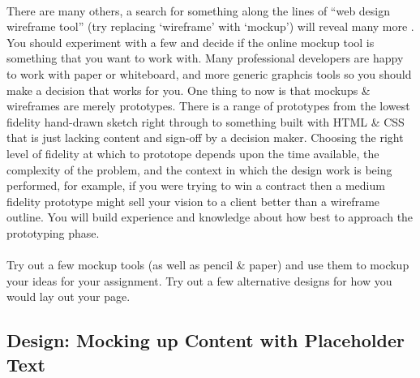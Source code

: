 \documentclass[10pt, a4paper]{article}
\begin{document}
\paragraph{} There are many others, a search for something along the lines of ``web design wireframe tool'' (try replacing `wireframe' with `mockup') will reveal many more . You should experiment with a few and decide if the online mockup tool is something that you want to work with. Many professional developers are happy to work with paper or whiteboard, and more generic graphcis tools so you should make a decision that works for you. One thing to now is that mockups  \& wireframes are merely prototypes. There is a range of prototypes from the lowest fidelity hand-drawn sketch right through to something built with HTML \& CSS that is just lacking content and sign-off by a decision maker. Choosing the right level of fidelity at which to prototope depends upon the time available, the complexity of the problem, and the context in which the design work is being performed, for example, if you were trying to win a contract then a medium fidelity prototype might sell your vision to a client better than a wireframe outline. You will build experience and knowledge about how best to approach the prototyping phase.

\paragraph{} Try out a few mockup tools (as well as pencil \& paper) and use them to mockup your ideas for your assignment. Try out a few alternative designs for how you would lay out your page.


\subsection{Design: Mocking up Content with Placeholder Text}
\end{document}
